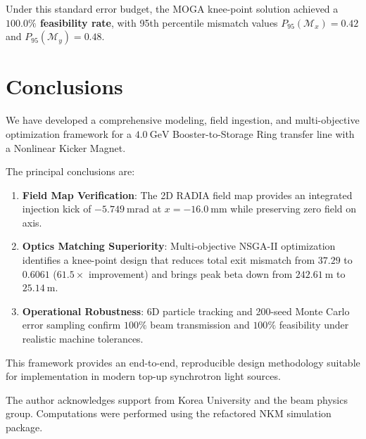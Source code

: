 \documentclass[a4paper,11pt]{article}
\begin{document}
Under this standard error budget, the MOGA knee-point solution achieved a \textbf{$100.0\%$ feasibility rate}, with 95th percentile mismatch values $P_{95}(\mathcal{M}_x) = 0.42$ and $P_{95}(\mathcal{M}_y) = 0.48$.

\section{Conclusions}
\label{sec:conclusions}

We have developed a comprehensive modeling, field ingestion, and multi-objective optimization framework for a $4.0~\mathrm{GeV}$ Booster-to-Storage Ring transfer line with a Nonlinear Kicker Magnet. 

The principal conclusions are:
\begin{enumerate}
    \item \textbf{Field Map Verification}: The 2D RADIA field map provides an integrated injection kick of $-5.749~\mathrm{mrad}$ at $x = -16.0~\mathrm{mm}$ while preserving zero field on axis.
    \item \textbf{Optics Matching Superiority}: Multi-objective NSGA-II optimization identifies a knee-point design that reduces total exit mismatch from $37.29$ to $0.6061$ ($61.5\times$ improvement) and brings peak beta down from $242.61~\mathrm{m}$ to $25.14~\mathrm{m}$.
    \item \textbf{Operational Robustness}: 6D particle tracking and 200-seed Monte Carlo error sampling confirm $100\%$ beam transmission and $100\%$ feasibility under realistic machine tolerances.
\end{enumerate}

This framework provides an end-to-end, reproducible design methodology suitable for implementation in modern top-up synchrotron light sources.

\acknowledgments

The author acknowledges support from Korea University and the beam physics group. Computations were performed using the refactored NKM simulation package.



\end{document}
